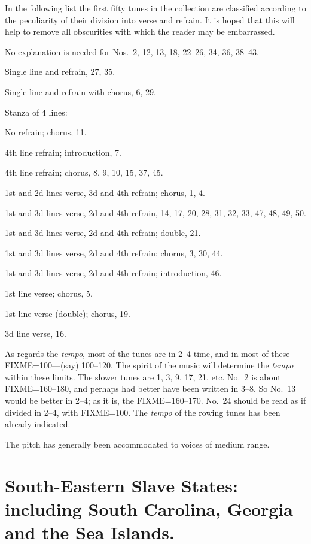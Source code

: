 \documentclass[a5paper,10pt]{book}
\begin{document}
In the following list the first fifty tunes in the collection are
classified according to the peculiarity of their division into verse
and refrain.  It is hoped that this will help to remove all
obscurities with which the reader may be embarrassed.


No explanation is needed for Nos.~2, 12, 13, 18, 22--26, 34, 36,
38--43.

Single line and refrain, 27, 35.

Single line and refrain with chorus, 6, 29.

Stanza of 4 lines:

No refrain; chorus, 11.

4th line refrain; introduction, 7.

4th line refrain; chorus, 8, 9, 10, 15, 37, 45.

1st and 2d lines verse, 3d and 4th refrain; chorus, 1, 4.

1st and 3d lines verse, 2d and 4th refrain, 14, 17, 20, 28, 31, 32,
33, 47, 48, 49, 50.

1st and 3d lines verse, 2d and 4th refrain; double, 21.

1st and 3d lines verse, 2d and 4th refrain; chorus, 3, 30, 44.

1st and 3d lines verse, 2d and 4th refrain; introduction, 46.

1st line verse; chorus, 5.

1st line verse (double); chorus, 19.

3d line verse, 16.


As regards the \emph{tempo}, most of the tunes are in 2--4 time, and
in most of these FIXME=100---(say) 100--120.  The spirit of the music
will determine the \emph{tempo} within these limits.  The slower tunes
are 1, 3, 9, 17, 21, etc.  No.~2 is about FIXME=160--180, and perhaps
had better have been written in 3--8.  So No.~13 would be better in
2--4; as it is, the FIXME=160--170.  No.~24 should be read as if
divided in 2--4, with FIXME=100.  The \emph{tempo} of the rowing tunes
has been already indicated.

The pitch has generally been accommodated to voices of medium range.



\cleardoublepage
{}

\part{South-Eastern Slave States: including South Carolina, Georgia and the Sea Islands.}
\end{document}
